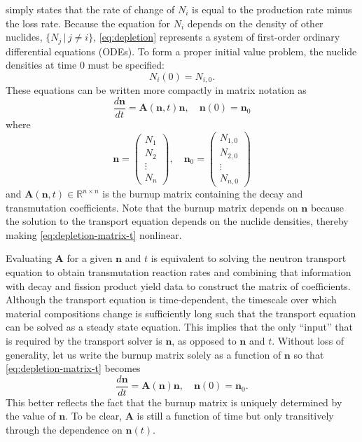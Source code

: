 \documentclass[3p,authoryear]{elsarticle}
\newcommand{\vect}[1]{\mathbf{#1}} %
\begin{document}
 simply states that the rate of change of $N_i$ is equal to
the production rate minus the loss rate. Because the equation for $N_i$ depends
on the density of other nuclides, $\{N_j \,|\, j \ne i\}$, \cref{eq:depletion}
represents a system of first-order ordinary differential equations (ODEs). To
form a proper initial value problem, the nuclide densities at time 0 must be
specified:
\begin{equation}
    N_i(0) = N_{i,0}.
\end{equation}
These equations can be written more compactly in matrix notation as
\begin{equation}
  \label{eq:depletion-matrix-t}
  \frac{d\vect{n}}{dt} = \vect{A}(\vect{n},t)\vect{n}, \quad \vect{n}(0) =
  \vect{n}_0
\end{equation}
where
\begin{equation}
  \vect{n} = \begin{pmatrix} N_1 \\ N_2 \\ \vdots \\ N_n \end{pmatrix}, \quad
  \vect{n}_0 = \begin{pmatrix} N_{1,0} \\ N_{2,0} \\ \vdots \\ N_{n,0} \end{pmatrix}
\end{equation}
and $\vect{A}(\vect{n},t) \in \mathbb{R}^{n\times n}$ is the burnup matrix
containing the decay and transmutation coefficients. Note that the burnup matrix
depends on $\vect{n}$ because the solution to the transport equation depends
on the nuclide densities, thereby making \cref{eq:depletion-matrix-t} nonlinear.

Evaluating $\vect{A}$ for a given $\vect{n}$ and $t$ is equivalent to solving
the neutron transport equation to obtain transmutation reaction rates and
combining that information with decay and fission product yield data to
construct the matrix of coefficients. Although the transport equation is
time-dependent, the timescale over which material compositions change is
sufficiently long such that the transport equation can be solved as a steady
state equation. This implies that the only ``input'' that is required by the
transport solver is $\vect{n}$, as opposed to $\vect{n}$ and $t$. Without loss of
generality, let us write the burnup matrix solely as a function of $\vect{n}$ so
that \cref{eq:depletion-matrix-t} becomes
\begin{equation}
  \label{eq:depletion-matrix}
  \frac{d\vect{n}}{dt} = \vect{A}(\vect{n})\vect{n}, \quad \vect{n}(0) =
  \vect{n}_0.
\end{equation}
This better reflects the fact that the burnup matrix is uniquely determined by
the value of $\vect{n}$. To be clear, $\vect{A}$ is still a function of time but
only transitively through the dependence on $\vect{n}(t)$.
\end{document}

